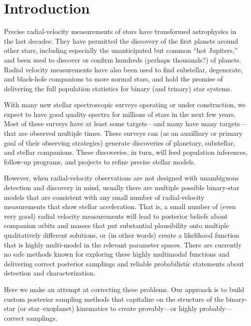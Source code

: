 \documentclass[manuscript, letterpaper]{aastex6}
\begin{document}

\section{Introduction} \label{sec:intro}

Precise radial-velocity measurements of stars have transformed
astrophysics in the last decades:
They have permitted the discovery of the first planets around other stars,
including especially the unanticipated but common ``hot Jupiters,''
and been used to discover or confirm hundreds
(perhaps thousands?) of planets.
Radial velocity measurements have also been used to find substellar,
degenerate, and black-hole companions to more normal stars, and hold
the promise of delivering the full population statistics for binary
(and trinary) star systems.

With many new stellar spectroscopic surveys operating or under
construction, we expect to have good quality spectra for millions
of stars in the next few years.
Most of these surveys have at least some targets---and many have many
targets---that are observed multiple times.
These surveys can (as an auxilliary or primary goal of their observing
strategies) generate discoveries of planetary, substellar, and stellar
companions.
These discoveries, in turn, will feed population inferences, follow-up
programs, and projects to refine precise stellar models.

However, when radial-velocity observations are not designed with
unambiguous detection and discovery in mind, usually there are
multiple possible binary-star models that are consistent with any
small number of radial-velocity measurements that show stellar
acceleration.
That is, a small number of (even very good) radial velocity
measurements will lead to posterior beliefs about companion orbits and
masses that put substantial plausibility onto multiple qualitatively
different solutions, or (in other words) create a likelihood function
that is highly multi-model in the relevant parameter spaces.
There are currently no safe methods known for exploring these highly
multimodal functions and delivering correct posterior samplings and
reliable probabilistic statements about detection and
characterization.

Here we make an attempt at correcting these problems.
Our approach is to build custom posterior sampling methods that
capitalize on the structure of the binary-star (or star--exoplanet)
kinematics to create provably---or highly probably---correct
samplings.
\end{document}
